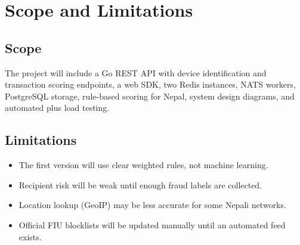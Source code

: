 \section{Scope and Limitations}

\subsection{Scope}
The project will include a Go REST API with device identification and transaction scoring endpoints, a web SDK,
two Redis instances, NATS workers, PostgreSQL storage, rule-based scoring for Nepal, system design diagrams,
and automated plus load testing.

\subsection{Limitations}
\begin{itemize}
  \item The first version will use clear weighted rules, not machine learning.
  \item Recipient risk will be weak until enough fraud labels are collected.
  \item Location lookup (GeoIP) may be less accurate for some Nepali networks.
  \item Official FIU blocklists will be updated manually until an automated feed exists.
\end{itemize}
